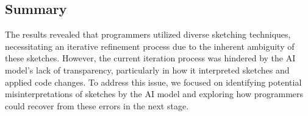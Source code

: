 \subsection{Summary}
The results revealed that programmers utilized diverse sketching techniques, necessitating an iterative refinement process due to the inherent ambiguity of these sketches.
However, the current iteration process was hindered by the AI model's lack of transparency, particularly in how it interpreted sketches and applied code changes.
To address this issue, we focused on identifying potential misinterpretations of sketches by the AI model and exploring how programmers could recover from these errors in the next stage.
